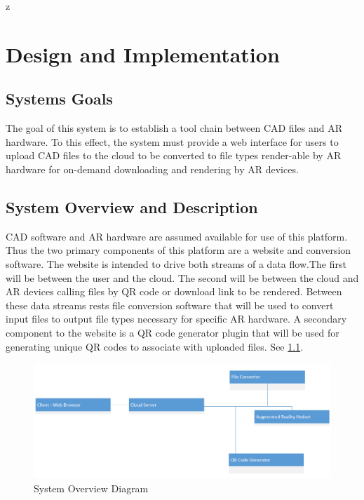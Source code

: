 z

\chapter{Design  and Implementation}

\section{Systems Goals}
The goal of this system is to establish a tool chain between CAD files and AR hardware. To this effect, the system must provide a web interface for users to upload CAD files to the cloud to be converted to file types render-able by AR hardware for on-demand downloading and rendering by AR devices.  

\section{System Overview and Description}
CAD software and AR hardware are assumed available for use of this platform. Thus the two primary components of this platform are a website and conversion software. The website is intended to drive both streams of a data flow.The first will be between the user and the cloud. The second will be between the cloud and AR devices calling files by QR code or download link to be rendered.  Between these data streams rests file conversion software that will be used to convert input files to output file types necessary for specific AR hardware. A secondary component to the website is a QR code generator plugin that will be used for generating unique QR codes to associate with uploaded files. See \ref{fig:UMLSystemOverview}.

\begin{figure}[H]
	\centering
	\includegraphics[width=\textwidth]{UMLSystemOverview.png}
	\caption{System Overview Diagram} 
	\label{fig:UMLSystemOverview}	
\end{figure}


